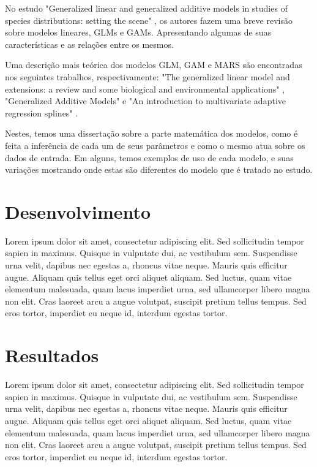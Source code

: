 \documentclass[
	12pt,				%
	openright,			%
	oneside,			%
	a4paper,			%
	english,			%
	brazil				%
	]{abntex2}
\begin{document}
No estudo "Generalized linear and generalized additive models in studies of species distributions: setting the scene" 
\cite{GAMeGLM_especie_estudo}, os autores fazem uma breve revisão sobre modelos lineares, GLMs e GAMs. Apresentando algumas
de suas características e as relações entre os mesmos.

Uma descrição mais teórica dos modelos GLM, GAM e MARS são encontradas nos seguintes trabalhos, respectivamente: "The generalized 
linear model and extensions: a review and some biological and environmental applications" \cite{GLM}, "Generalized Additive Models"
\cite{GAM} e "An introduction to multivariate adaptive regression splines" \cite{MARS}.

Nestes, temos uma dissertação sobre a parte matemática dos modelos, como é feita a inferência de cada um de seus parâmetros e 
como o mesmo atua sobre os dados de entrada. Em alguns, temos exemplos de uso de cada modelo, e suas variações mostrando onde estas 
são diferentes do modelo que é tratado no estudo.


 \chapter{Desenvolvimento}

 Lorem ipsum dolor sit amet, consectetur adipiscing elit. Sed sollicitudin tempor sapien in maximus. Quisque in vulputate dui, ac vestibulum sem. Suspendisse urna velit, dapibus nec egestas a, rhoncus vitae neque. Mauris quis efficitur augue. Aliquam quis tellus eget orci aliquet aliquam. Sed luctus, quam vitae elementum malesuada, quam lacus imperdiet urna, sed ullamcorper libero magna non elit. Cras laoreet arcu a augue volutpat, suscipit pretium tellus tempus. Sed eros tortor, imperdiet eu neque id, interdum egestas tortor.

 \chapter{Resultados}

 Lorem ipsum dolor sit amet, consectetur adipiscing elit. Sed sollicitudin tempor sapien in maximus. Quisque in vulputate dui, ac vestibulum sem. Suspendisse urna velit, dapibus nec egestas a, rhoncus vitae neque. Mauris quis efficitur augue. Aliquam quis tellus eget orci aliquet aliquam. Sed luctus, quam vitae elementum malesuada, quam lacus imperdiet urna, sed ullamcorper libero magna non elit. Cras laoreet arcu a augue volutpat, suscipit pretium tellus tempus. Sed eros tortor, imperdiet eu neque id, interdum egestas tortor.
\end{document}
